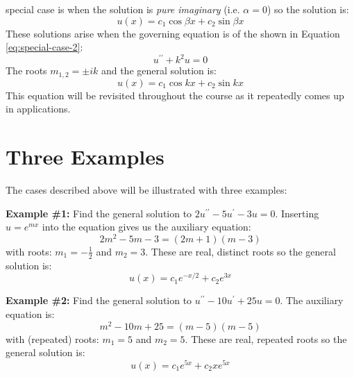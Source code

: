 \begin{enumerate}
 special case is when the solution is \emph{pure imaginary} (i.e. $\alpha = 0$) so the solution is:
\begin{equation}
u(x) = c_1 \cos{\beta x} + c_2 \sin{\beta x}
\end{equation}
These solutions arise when the governing equation is of the shown in Equation \ref{eq:special-case-2}:
\begin{equation}
u^{\prime \prime} + k^2 u = 0
\label{eq:special-case-2}
\end{equation}
The roots $m_{1,2} = \pm ik$ and the general solution is:
\begin{equation}
u(x)=c_1 \cos{kx} + c_2 \sin{kx}
\end{equation}
This equation will be revisited throughout the course as it repeatedly comes up in applications.
\end{enumerate}

\section{Three Examples}
The cases described above will be illustrated with three examples:

\vspace{0.5cm}
\noindent\textbf{Example \#1:}
Find the general solution to $2u^{\prime \prime}-5u^{\prime}-3u = 0$. Inserting $u = e^{mx}$ into the equation gives us the auxiliary equation:
\begin{equation*}
2m^2 - 5m - 3 = (2m+1)(m-3)
\end{equation*}
with roots: $m_1 = -\frac{1}{2}$ and $m_2 = 3$.  These are real, distinct roots so the general solution is:
\begin{equation*}
u(x) = c_1e^{-x/2}+c_2e^{3x}
\end{equation*}

\vspace{0.5cm}

\noindent\textbf{Example \#2:}
Find the general solution to $u^{\prime \prime}-10u^{\prime}+25u = 0$.
The auxiliary equation is:
\begin{equation*}
m^2-10m+25 = (m-5)(m-5)
\end{equation*}
with (repeated) roots: $m_1 = 5$ and $m_2 = 5$.  These are real, repeated roots so the general solution is:
\begin{equation*}
u(x) = c_1e^{5x} + c_2xe^{5x}
\end{equation*}

\vspace{0.5cm}

